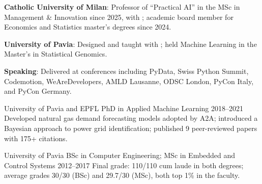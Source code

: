 \documentclass[10pt,a4paper]{article}
\begin{document}
\begin{cvsectionitems}
  \item \textbf{Catholic University of Milan}: Professor of ``Practical AI'' in the MSc in Management \& Innovation since 2025, with ; academic board member for Economics and Statistics master's degrees since 2024.
  \item \textbf{University of Pavia}: Designed and taught  with ; held Machine Learning in the Master's in Statistical Genomics.
  \item \textbf{Speaking}: Delivered  at conferences including PyData, Swiss Python Summit, Codemotion, WeAreDevelopers, AMLD Lausanne, ODSC London, PyCon Italy, and PyCon Germany.
\end{cvsectionitems}

\begin{cventries}
  \cventry
    {University of Pavia and EPFL}
    {PhD in Applied Machine Learning}
    {}
    {2018--2021}
    {Developed natural gas demand forecasting models adopted by A2A; introduced a Bayesian approach to power grid identification; published 9 peer-reviewed papers with 175+ citations.}

  \cventry
    {University of Pavia}
    {BSc in Computer Engineering; MSc in Embedded and Control Systems}
    {}
    {2012--2017}
    {Final grade: 110/110 cum laude in both degrees; average grades 30/30 (BSc) and 29.7/30 (MSc), both top 1\% in the faculty.}
\end{cventries}

\begin{cvparagraph}
\\
\\
\\
\\
\\
\end{cvparagraph}

\begin{cvparagraph}
\end{cvparagraph}
\end{document}
